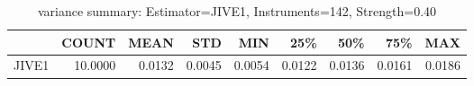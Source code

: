 \begin{table}[ht]
\centering
\caption{variance summary: Estimator=JIVE1, Instruments=142, Strength=0.40}
\begin{tabular}{lrrrrrrrr}
\toprule
 & COUNT & MEAN & STD & MIN & 25\% & 50\% & 75\% & MAX \\
\midrule
JIVE1 & 10.0000 & 0.0132 & 0.0045 & 0.0054 & 0.0122 & 0.0136 & 0.0161 & 0.0186 \\
\bottomrule
\end{tabular}
\end{table}
